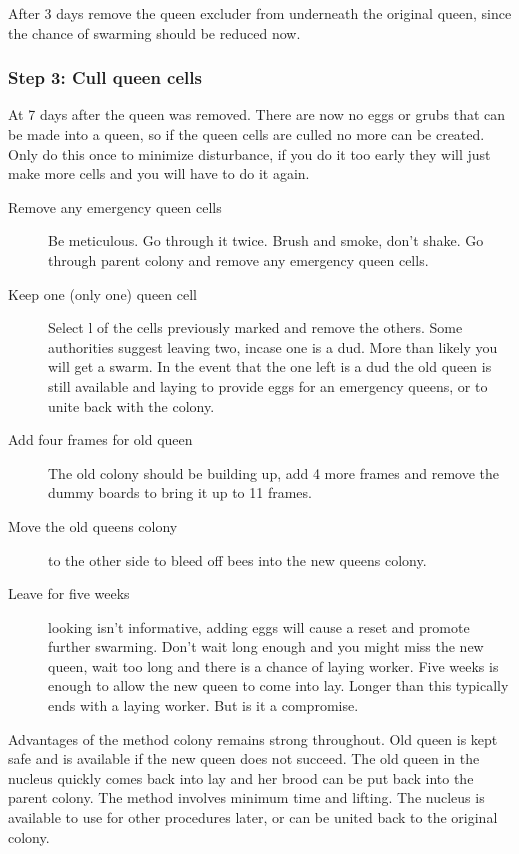 After 3 days remove the queen excluder from underneath the original queen,
since the chance of swarming should be reduced now.

\subsubsection*{Step 3: Cull queen cells}

At 7 days after the queen was removed.
There are now no eggs or grubs that can be made into a queen, 
so if the queen cells are culled no more can be created.
Only do this once to minimize disturbance,
if you do it too early they will just make more cells and you will have to do it again.

\begin{description}
  \item[Remove any emergency queen cells] Be meticulous.  Go through it twice.  Brush and smoke, don't shake.
  Go through parent colony and remove any emergency queen cells.
  \item[Keep one (only one) queen cell]
  Select l of the cells previously marked and remove the others.
  Some authorities suggest leaving two, incase one is a dud.
  More than likely you will get a swarm.
  In the event that the one left is a dud the old queen is still available and laying to provide eggs for an emergency queens,
  or to unite back with the colony.
  \item[Add four frames for old queen] The old colony should be building up, add 4 more frames and remove the dummy boards to bring it up to 11 frames.
  \item[Move the old queens colony] to the other side to bleed off bees into the new queens colony.
  \item[Leave for five weeks] looking isn't informative, adding eggs will cause a reset and promote further swarming.
  Don't wait long enough and you might miss the new queen, wait too long and there is a chance of laying worker.
  Five weeks is enough to allow the new queen to come into lay.  Longer than this typically ends with a laying worker.
  But is it a compromise.
\end{description}

Advantages of the method
colony remains strong throughout.
Old queen is kept safe and is available if the new queen does not succeed.
The old queen in the nucleus quickly comes back into lay and her brood can be put back into the parent colony.
The method involves minimum time and lifting.
The nucleus is available to use for other procedures later, or can be united back to the original colony.

